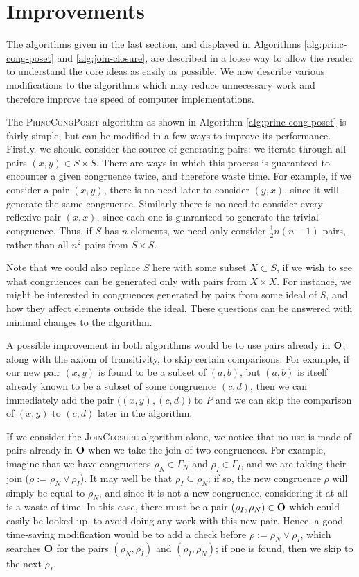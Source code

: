 \section{Improvements}
\label{sec:lattice-improvements}

The algorithms given in the last section, and displayed in Algorithms
\ref{alg:princ-cong-poset} and \ref{alg:join-closure}, are described in a loose
way to allow the reader to understand the core ideas as easily as possible.  We
now describe various modifications to the algorithms which may reduce
unnecessary work and therefore improve the speed of computer implementations.

The \textsc{PrincCongPoset} algorithm as shown in Algorithm
\ref{alg:princ-cong-poset} is fairly simple, but can be modified in a few ways
to improve its performance.  Firstly, we should consider the source of
generating pairs: we iterate through all pairs $(x,y) \in S \times S$.  There
are ways in which this process is guaranteed to encounter a given congruence
twice, and therefore waste time.  For example, if we consider a pair $(x,y)$,
there is no need later to consider $(y,x)$, since it will generate the same
congruence.  Similarly there is no need to consider every reflexive pair
$(x,x)$, since each one is guaranteed to generate the trivial congruence.  Thus,
if $S$ has $n$ elements, we need only consider $\frac{1}{2}n(n-1)$ pairs, rather
than all $n^2$ pairs from $S \times S$.

Note that we could also replace $S$ here with some subset $X \subset S$, if we
wish to see what congruences can be generated only with pairs from $X \times X$.
For instance, we might be interested in congruences generated by pairs from some
ideal of $S$, and how they affect elements outside the ideal.  These questions
can be answered with minimal changes to the algorithm.

A possible improvement in both algorithms would be to use pairs already in
$\mathbf{O}$, along with the axiom of transitivity, to skip certain comparisons.  For
example, if our new pair $(x,y)$ is found to be a subset of $(a,b)$, but $(a,b)$
is itself already known to be a subset of some congruence $(c,d)$, then we can
immediately add the pair $\big((x,y), (c,d)\big)$ to $P$ and we can skip the
comparison of $(x,y)$ to $(c,d)$ later in the algorithm.

If we consider the \textsc{JoinClosure} algorithm alone, we notice that no use
is made of pairs already in $\mathbf{O}$ when we take the join of two congruences.  For
example, imagine that we have congruences $\rho_N \in \Gamma_N$ and
$\rho_I \in \Gamma_I$, and we are taking their join
($\rho := \rho_N \vee \rho_I$).  It may well be that $\rho_I \subseteq \rho_N$;
if so, the new congruence $\rho$ will simply be equal to $\rho_N$, and since it
is not a new congruence, considering it at all is a waste of time.  In this
case, there must be a pair $(\rho_I, \rho_N) \in \mathbf{O}$ which could easily be
looked up, to avoid doing any work with this new pair.  Hence, a good
time-saving modification would be to add a check before
$\rho := \rho_N \vee \rho _I$, which searches $\mathbf{O}$ for the pairs
$(\rho_N, \rho_I)$ and $(\rho_I, \rho_N)$; if one is found, then we skip to the
next $\rho_I$.

